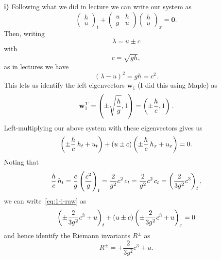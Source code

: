 \documentclass{article}
\def\*#1{\mathbf{#1}}
\begin{document}
\textbf{i)} Following what we did in lecture we can write our system as
%
\begin{equation*}
    \begin{pmatrix}
        h \\
        u
    \end{pmatrix}_t
    +
    \begin{pmatrix}
        u & h \\
        g & u
    \end{pmatrix}
    \begin{pmatrix}
        h \\
        u
    \end{pmatrix}_x
    = \*0
    .
\end{equation*}
%
Then, writing
%
\begin{equation*}
    \lambda = u \pm c
\end{equation*}
%
with
%
\begin{equation*}
    c = \sqrt{g h}
    ,
\end{equation*}
%
as in lectures we have
%
\begin{equation*}
    (\lambda - u)^2 = g h = c^2
    .
\end{equation*}
%
This lets us identify the left eigenvectors $\*w_1$ (I did this using
Maple) as
%
\begin{equation*}
    \*w_1^T
    = \del{\pm \sqrt{\frac{h}{g}}, 1}
    = \del{\pm \frac{h}{c}, 1}
    .
\end{equation*}
%
Left-multiplying our above system with these eigenvectors gives us
%
\begin{equation}
    \del{\pm \frac{h}{c} \, h_t + u_t} + (u \pm c) \del{\pm \frac{h}{c} \, h_x + u_x} = 0
    \label{eq:1-i-raw}
    .
\end{equation}
%
Noting that
%
\begin{equation*}
    \frac{h}{c}\, h_t
    = \frac{c}{g} \del{\frac{c^2}{g}}_t
    = \frac{2}{g^2} c^2 \, c_t
    = \frac{2}{g^2} c^2 \, c_t
    = \del{\frac{2}{3 g^2} c^3}_t
    ,
\end{equation*}
%
we can write~\eqref{eq:1-i-raw} as
%
\begin{equation*}
    \del{\pm \frac{2}{3 g^2} c^3 + u}_t + (u \pm c) \del{\pm \frac{2}{3 g^2} c^3 + u}_x = 0
\end{equation*}
%
and hence identify the Riemann invariants $R^\pm$ as
%
\begin{equation*}
    R^\pm = \pm \frac{2}{3 g^2} c^3 + u
    .
\end{equation*}
\end{document}
